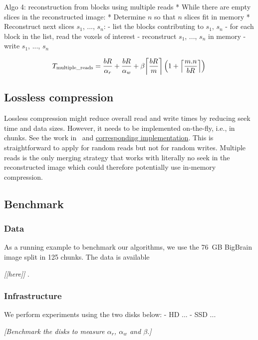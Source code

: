 \documentclass[10pt, conference, compsocconf]{IEEEtran}
\DeclarePairedDelimiter{\ceil}{\lceil}{\rceil}
\newcommand{\todo}[1]{
  \color{red}\emph{[#1]}
  \color{black}
}
\begin{document}
Algo 4: reconstruction from blocks using multiple reads
* While there are empty slices in the reconstructed image:
  * Determine $n$ so that $n$ slices fit in memory
  * Reconstruct next slices $s_1$, ...,  $s_n$:
     - list the blocks contributing to $s_1$, $s_n$
     - for each block in the list, read the voxels of interest
     - reconstruct $s_1$, ..., $s_n$ in memory
     - write $s_1$, ..., $s_n$

     \begin{equation}
       T_\mathrm{multiple\_reads}= \frac{bR}{\alpha_r}+\frac{bR}{\alpha_w} + \beta\ceil*{\frac{bR}{m}}\left(1+ \ceil*{\frac{m.n}{bR}}\right)\\
\end{equation}
     
\subsection{Lossless compression}
     
Lossless compression might reduce overall read and write times by
reducing seek time and data sizes. However, it needs to be implemented
on-the-fly, i.e., in chunks. See the work in~\cite{rajna2015speeding}
and
\href{https://github.com/pauldmccarthy/indexed\_gzip}{corresponding
  implementation}. This is straightforward to apply for random reads
but not for random writes. Multiple reads is the only merging strategy
that works with literally no seek in the reconstructed image which
could therefore potentially use in-memory compression.
     
\subsection{Benchmark}
\label{sec:benchmark}

\subsubsection{Data}
As a running example to benchmark our algorithms, we use the 76~GB
BigBrain image split in 125 chunks. The data is available
\todo{[here]}.

\subsubsection{Infrastructure}
 We
perform experiments using the two disks below:
- HD ...
- SSD ...

\todo{Benchmark the disks to measure $\alpha_r$, $\alpha_w$ and $\beta$.}
\end{document}

